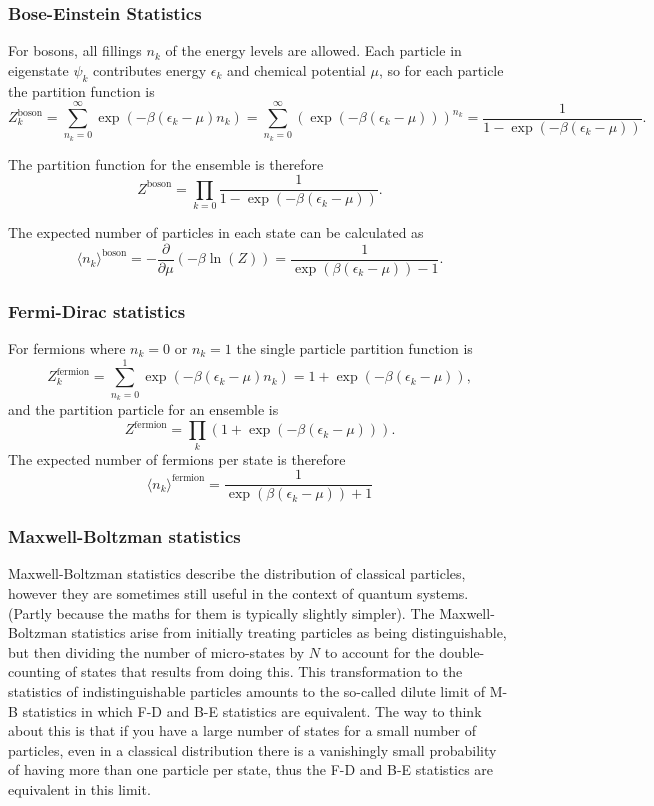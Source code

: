 \subsubsection{Bose-Einstein Statistics}
For bosons, all fillings $n_k$ of the energy levels are allowed. Each particle in eigenstate $\psi_k$ contributes energy $\epsilon_k$ and chemical potential $\mu$, so for each particle the partition function is
$$
	Z_k^\text{boson} = \sum_{n_k=0}^\infty\exp(-\beta(\epsilon_k-\mu)n_k) = \sum_{n_k=0}^\infty\left(\exp(-\beta(\epsilon_k-\mu))\right)^{n_k} = \frac{1}{1-\exp(-\beta(\epsilon_k-\mu))}.
$$

The partition function for the ensemble is therefore
$$
	Z^\text{boson} = \prod_{k=0} \frac{1}{1-\exp(-\beta(\epsilon_k-\mu))}.
$$

The expected number of particles in each state can be calculated as
$$
	\langle n_k \rangle^\text{boson} = -\frac{\partial}{\partial \mu}(-\beta\ln(Z)) = \frac{1}{\exp(\beta(\epsilon_k-\mu))-1}.
$$

\subsubsection{Fermi-Dirac statistics}
For fermions where $n_k=0$ or $n_k=1$ the single particle partition function is
$$
	Z_k^\text{fermion} = \sum_{n_k=0}^1 \exp(-\beta(\epsilon_k-\mu)n_k) = 1 + \exp(-\beta(\epsilon_k-\mu)),
$$
and the partition particle for an ensemble is
$$
	Z^\text{fermion} = \prod_k(1+ \exp(-\beta(\epsilon_k-\mu))).
$$
The expected number of fermions per state is therefore
$$
		\langle n_k \rangle^\text{fermion} = \frac{1}{\exp(\beta(\epsilon_k-\mu))+1}
$$

\subsubsection{Maxwell-Boltzman statistics}
Maxwell-Boltzman statistics describe the distribution of classical particles, however they are sometimes still useful in the context of quantum systems. (Partly because the maths for them is typically slightly simpler). The Maxwell-Boltzman statistics arise from initially treating particles as being distinguishable, but then dividing the number of micro-states by $N\!$ to account for the double-counting of states that results from doing this. This transformation to the statistics of indistinguishable particles amounts to the so-called dilute limit of M-B statistics in which F-D and B-E statistics are equivalent. The way to think about this is that if you have a large number of states for a small number of particles, even in a classical distribution there is a vanishingly small probability of having more than one particle per state, thus the F-D and B-E statistics are equivalent in this limit.

